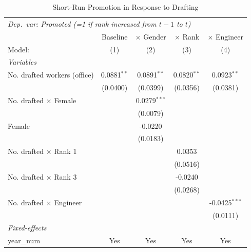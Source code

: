 \begin{table}[htbp]
\centering
\caption{Short-Run Promotion in Response to Drafting}
\label{tab:promotion}
\begin{threeparttable}
\begin{tabular}{lcccc}
   \tabularnewline \midrule \midrule
\multicolumn{5}{l}{\textit{Dep.\ var: Promoted (=1 if rank increased from $t{-}1$ to $t$)}} \\
                                  & Baseline      & $\times$ Gender  & $\times$ Rank  & $\times$ Engineer \\    
   Model:                         & (1)           & (2)              & (3)            & (4)\\  
   \midrule
   \emph{Variables}\\
   No. drafted workers (office)   & 0.0881$^{**}$ & 0.0891$^{**}$    & 0.0820$^{**}$  & 0.0923$^{**}$\\   
                                  & (0.0400)      & (0.0399)         & (0.0356)       & (0.0381)\\   
   No. drafted $\times$ Female    &               & 0.0279$^{***}$   &                &   \\   
                                  &               & (0.0079)         &                &   \\   
   Female                         &               & -0.0220          &                &   \\   
                                  &               & (0.0183)         &                &   \\   
   No. drafted $\times$ Rank 1    &               &                  & 0.0353         &   \\   
                                  &               &                  & (0.0516)       &   \\   
   No. drafted $\times$ Rank 3    &               &                  & -0.0240        &   \\   
                                  &               &                  & (0.0268)       &   \\   
   No. drafted $\times$ Engineer  &               &                  &                & -0.0425$^{***}$\\   
                                  &               &                  &                & (0.0111)\\   
   \midrule
   \emph{Fixed-effects}\\
   year\_num                      & Yes           & Yes              & Yes            & Yes\\  

\end{tabular}
\end{threeparttable}
\end{table}
